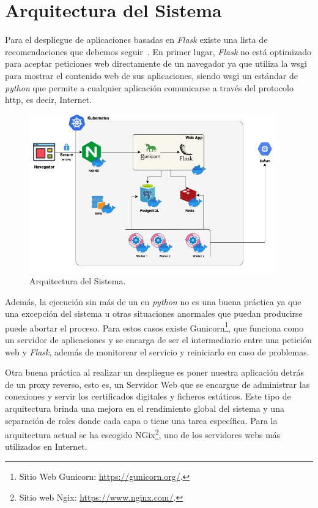 \documentclass[11pt,spanish,listoffigures,listoftables]{tfgetsinf}
\begin{document}
\section{Arquitectura del Sistema}

Para el despliegue de aplicaciones basadas en \textit{Flask} existe una lista de recomendaciones que debemos seguir~\cite{link-deploy-flask}. En primer lugar, \textit{Flask} no está optimizado para aceptar peticiones web directamente de un navegador ya que utiliza la \acrfull{wsgi} para mostrar el contenido web de sus aplicaciones, siendo \acrshort{wsgi} un estándar de \textit{python} que permite a cualquier aplicación comunicarse a través del protocolo \acrshort{http}, es decir, Internet. 

\begin{figure}[!t]
	\centering
	\includegraphics[width=0.95\textwidth]{img/infrastructure-pizarra}
    \caption[Arquitectura del Sistema]{Arquitectura del Sistema.}
	\label{figura:infrastructure-pizarra}
\end{figure}

Además, la ejecución sin más de un  en \textit{python} no es una buena práctica ya que una excepción del sistema u otras situaciones anormales que puedan producirse puede abortar el proceso. Para estos casos existe Gunicorn\footnote{Sitio Web Gunicorn: \url{https://gunicorn.org/}.}, que funciona como un servidor de aplicaciones y se encarga de ser el intermediario entre una petición web y \textit{Flask}, además de monitorear el servicio y reiniciarlo en caso de problemas.

Otra buena práctica al realizar un despliegue es poner nuestra aplicación detrás de un proxy reverso, esto es, un Servidor Web que se encargue de administrar las conexiones y servir los certificados digitales y ficheros estáticos. Este tipo de arquitectura brinda una mejora en el rendimiento global del sistema y una separación de roles donde cada capa o  tiene una tarea específica. Para la arquitectura actual se ha escogido NGix\footnote{Sitio web Ngix: \url{https://www.nginx.com/}.}, uno de los servidores webs más utilizados en Internet.
\end{document}
